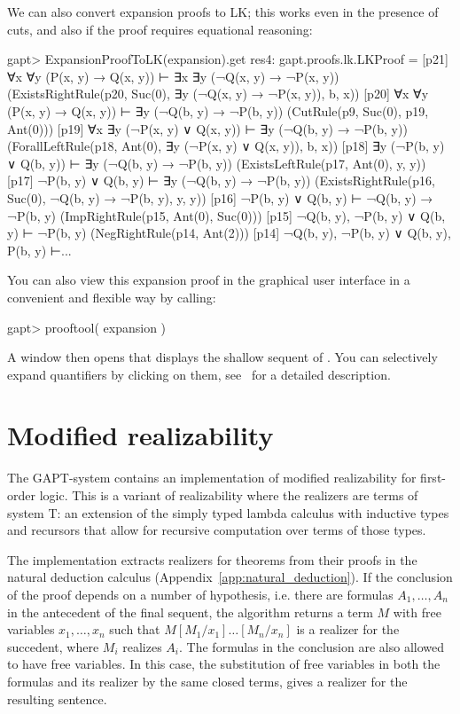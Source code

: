 \documentclass[a4paper,11pt]{book}
\newcommand{\cli}[1]{{\ttfamily {#1}}}
\begin{document}
We can also convert expansion proofs to LK; this works even in the presence of
cuts, and also if the proof requires equational reasoning:
\begin{clilisting}
gapt> ExpansionProofToLK(expansion).get
res4: gapt.proofs.lk.LKProof =
[p21] ∀x ∀y (P(x, y) → Q(x, y)) ⊢ ∃x ∃y (¬Q(x, y) → ¬P(x, y))    (ExistsRightRule(p20, Suc(0), ∃y (¬Q(x, y) → ¬P(x, y)), b, x))
[p20] ∀x ∀y (P(x, y) → Q(x, y)) ⊢ ∃y (¬Q(b, y) → ¬P(b, y))    (CutRule(p9, Suc(0), p19, Ant(0)))
[p19] ∀x ∃y (¬P(x, y) ∨ Q(x, y)) ⊢ ∃y (¬Q(b, y) → ¬P(b, y))    (ForallLeftRule(p18, Ant(0), ∃y (¬P(x, y) ∨ Q(x, y)), b, x))
[p18] ∃y (¬P(b, y) ∨ Q(b, y)) ⊢ ∃y (¬Q(b, y) → ¬P(b, y))    (ExistsLeftRule(p17, Ant(0), y, y))
[p17] ¬P(b, y) ∨ Q(b, y) ⊢ ∃y (¬Q(b, y) → ¬P(b, y))    (ExistsRightRule(p16, Suc(0), ¬Q(b, y) → ¬P(b, y), y, y))
[p16] ¬P(b, y) ∨ Q(b, y) ⊢ ¬Q(b, y) → ¬P(b, y)    (ImpRightRule(p15, Ant(0), Suc(0)))
[p15] ¬Q(b, y), ¬P(b, y) ∨ Q(b, y) ⊢ ¬P(b, y)    (NegRightRule(p14, Ant(2)))
[p14] ¬Q(b, y), ¬P(b, y) ∨ Q(b, y), P(b, y) ⊢...

\end{clilisting}

You can also view this expansion proof in the graphical user interface in
a convenient and flexible way by calling:
\begin{clilisting}
gapt> prooftool( expansion )

\end{clilisting}

A window then opens that displays the shallow sequent of \cli{expansion}.  You
can selectively expand quantifiers by clicking on them,
see~\cite{Hetzl13Understanding} for a detailed description.

\section{Modified realizability}

The GAPT-system contains an implementation of modified realizability for first-order logic. This is a variant of realizability where the realizers are terms of system T: an extension of the simply typed lambda calculus with inductive types and recursors that allow for recursive computation over terms of those types. 

The implementation extracts realizers for theorems from their proofs in the natural deduction calculus (Appendix~\ref{app:natural_deduction}). If the conclusion of the proof depends on a number of hypothesis, i.e. there are formulas $A_1,\dots,A_n$ in the antecedent of the final sequent, the algorithm returns a term $M$ with free variables  $x_1,\dots,x_n$ such that $M[M_1/x_1]\dots[M_n/x_n]$ is a realizer for the succedent, where $M_i$ realizes $A_i$. The formulas in the conclusion are also allowed to have free variables. In this case, the substitution of free variables in both the formulas and its realizer by the same closed terms, gives a realizer for the resulting sentence.
\end{document}
